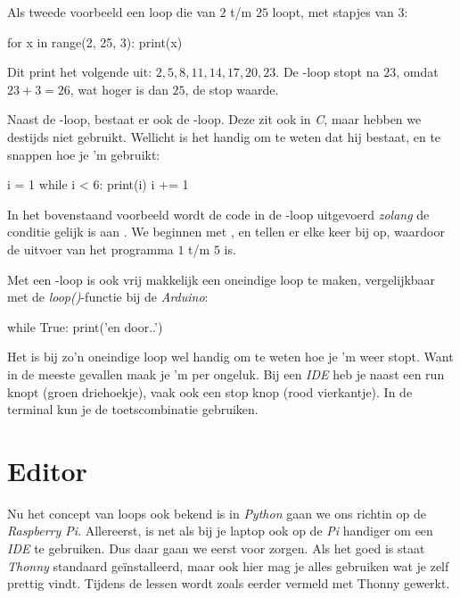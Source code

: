 Als tweede voorbeeld een loop die van $2$ t/m $25$ loopt, met stapjes van $3$:
\begin{python}
for x in range(2, 25, 3):
	print(x)
\end{python}
Dit print het volgende uit: $2, 5, 8, 11, 14, 17, 20, 23$. De -loop stopt na $23$, omdat $23+3 = 26$, wat hoger is dan $25$, de stop waarde. 

Naast de -loop, bestaat er ook de -loop. Deze zit ook in \textit{C}, maar hebben we destijds niet gebruikt. Wellicht is het handig om te weten dat hij bestaat, en te snappen hoe je 'm gebruikt:
\begin{python}
i = 1
while i < 6:
	print(i)
	i += 1
\end{python}
In het bovenstaand voorbeeld wordt de code in de -loop uitgevoerd \textit{zolang} de conditie  gelijk is aan . We beginnen met , en tellen er elke keer  bij op, waardoor de uitvoer van het programma $1$ t/m $5$ is. 

Met een -loop is ook vrij makkelijk een oneindige loop te maken, vergelijkbaar met de \textit{loop()}-functie bij de \textit{Arduino}:
\begin{python}
while True:
	print('en door..')
\end{python}

\begin{remark}
Het is bij zo'n oneindige loop wel handig om te weten hoe je 'm weer stopt. Want in de meeste gevallen maak je 'm per ongeluk. Bij een \textit{IDE} heb je naast een run knopt (groen driehoekje), vaak ook een stop knop (rood vierkantje). In de terminal kun je de toetscombinatie  gebruiken. 
\end{remark}

\newpage

\section{Editor}
Nu het concept van loops ook bekend is in \textit{Python} gaan we ons richtin op de \textit{Raspberry Pi}. Allereerst, is net als bij je laptop ook op de \textit{Pi} handiger om een \textit{IDE} te gebruiken. Dus daar gaan we eerst voor zorgen. Als het goed is staat \textit{Thonny} standaard geïnstalleerd, maar ook hier mag je alles gebruiken wat je zelf prettig vindt. Tijdens de lessen wordt zoals eerder vermeld met Thonny gewerkt. 

